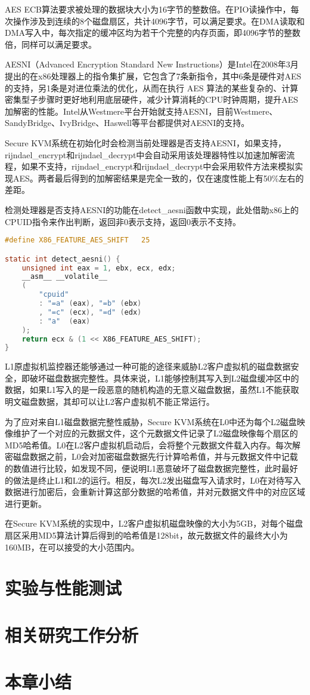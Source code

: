 AES ECB算法要求被处理的数据块大小为16字节的整数倍。在PIO读操作中，每次操作涉及到连续的8个磁盘扇区，共计4096字节，可以满足要求。在DMA读取和DMA写入中，每次指定的缓冲区均为若干个完整的内存页面，即4096字节的整数倍，同样可以满足要求。

AESNI（Advanced Encryption Standard New Instructions）是Intel在2008年3月提出的在x86处理器上的指令集扩展，它包含了7条新指令，其中6条是硬件对AES的支持，另1条是对进位乘法的优化，从而在执行 AES 算法的某些复杂的、计算密集型子步骤时更好地利用底层硬件，减少计算消耗的CPU时钟周期，提升AES加解密的性能。Intel从Westmere平台开始就支持AESNI，目前Westmere、SandyBridge、IvyBridge、Haswell等平台都提供对AESNI的支持。

Secure KVM系统在初始化时会检测当前处理器是否支持AESNI，如果支持，rijndael\_encrypt和rijndael\_decrypt中会自动采用该处理器特性以加速加解密流程，如果不支持，rijndael\_encrypt和rijndael\_decrypt中会采用软件方法来模拟实现AES。两者最后得到的加解密结果是完全一致的，仅在速度性能上有50\%左右的差距。

检测处理器是否支持AESNI的功能在detect\_aesni函数中实现，此处借助x86上的CPUID指令来作出判断，返回非0表示支持，返回0表示不支持。

\begin{lstlisting}[language={C}, caption={detect\_aesni实现源代码}]
#define X86_FEATURE_AES_SHIFT	25

static int detect_aesni() {
	unsigned int eax = 1, ebx, ecx, edx;
	__asm__ __volatile__
    (
        "cpuid"
        : "=a" (eax), "=b" (ebx)
        , "=c" (ecx), "=d" (edx)
        : "a"  (eax)
    );
    return ecx & (1 << X86_FEATURE_AES_SHIFT);
}
\end{lstlisting}

L1原虚拟机监控器还能够通过一种可能的途径来威胁L2客户虚拟机的磁盘数据安全，即破坏磁盘数据完整性。具体来说，L1能够控制其写入到L2磁盘缓冲区中的数据，如果L1写入的是一段恶意的随机构造的无意义磁盘数据，虽然L1不能获取明文磁盘数据，其却可以让L2客户虚拟机不能正常运行。

为了应对来自L1磁盘数据完整性威胁，Secure KVM系统在L0中还为每个L2磁盘映像维护了一个对应的元数据文件，这个元数据文件记录了L2磁盘映像每个扇区的MD5哈希值。L0在L2客户虚拟机启动后，会将整个元数据文件载入内存。每次解密磁盘数据之前，L0会对加密磁盘数据先行计算哈希值，并与元数据文件中记载的数值进行比较，如发现不同，便说明L1恶意破坏了磁盘数据完整性，此时最好的做法是终止L1和L2的运行。相反，每次L2发出磁盘写入请求时，L0在对待写入数据进行加密后，会重新计算这部分数据的哈希值，并对元数据文件中的对应区域进行更新。

在Secure KVM系统的实现中，L2客户虚拟机磁盘映像的大小为5GB，对每个磁盘扇区采用MD5算法计算后得到的哈希值是128bit，故元数据文件的最终大小为160MB，在可以接受的大小范围内。

\section{实验与性能测试}



\section{相关研究工作分析}



\section{本章小结}
